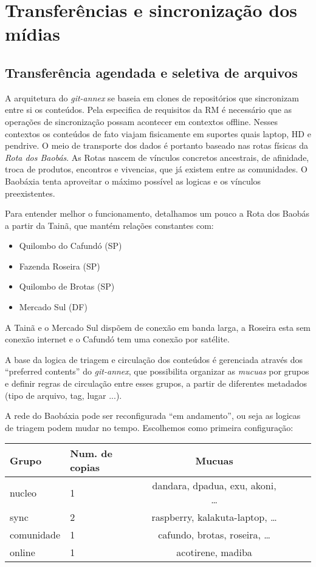 \chapter{Transferências e sincronização dos mídias}\label{Transferências e sincronização dos mídias}\lhead{\leftmark}

\section{Transferência agendada e seletiva de arquivos}
A arquitetura do \emph{git-annex} se baseia em clones de repositórios
que sincronizam entre si os conteúdos. Pela especifica de requisitos
da RM é necessário que as operações de sincronização possam acontecer
em contextos offline. Nesses contextos os conteúdos de fato viajam
fisicamente em suportes quais laptop, HD e pendrive. O meio de
transporte dos dados é portanto baseado nas rotas físicas da
\emph{Rota dos Baobás}. As Rotas nascem de vínculos concretos
ancestrais, de afinidade, troca de produtos, encontros e vivencias,
que já existem entre as comunidades. O Baobáxia tenta aproveitar o
máximo possível as logicas e os vínculos preexistentes. 

Para entender melhor o funcionamento, detalhamos um pouco a Rota dos
Baobás a partir da Tainã, que mantém relações constantes com:
\begin{itemize}
  \item Quilombo do Cafundó (SP)
  \item Fazenda Roseira (SP)
  \item Quilombo de Brotas (SP)
  \item Mercado Sul (DF)
\end{itemize}

A Tainã e o Mercado Sul dispõem de conexão em banda larga, a Roseira
esta sem conexão internet e o Cafundó tem uma conexão por satélite.

A base da logica de triagem e circulação dos conteúdos é gerenciada
através dos ``preferred contents'' do \emph{git-annex}, que
possibilita organizar as \emph{mucuas} por grupos e definir regras de
circulação entre esses grupos, a partir de diferentes metadados (tipo
de arquivo, tag, lugar ...).

A rede do Baobáxia pode ser reconfigurada ``em andamento'', ou seja as
logicas de triagem podem mudar no tempo. Escolhemos como primeira
configuração:
\begin{table}[h]
  \centering
  \begin{tabularx}{\textwidth}{l|X| c X r X }
    \textbf{Grupo} & \textbf{Num. de copias} & \textbf{Mucuas} \\ [0.5ex]
    \hline                       
    nucleo & 1 & dandara, dpadua, exu, akoni, \ldots \\
    sync & 2 & raspberry, kalakuta-laptop, \ldots \\
    comunidade & 1 & cafundo, brotas, roseira, \ldots \\
    online & 1 & acotirene, madiba \\
    \hline  
  \end{tabularx}
\end{table}


